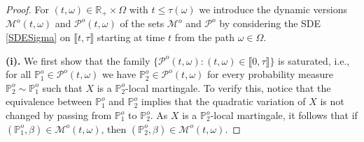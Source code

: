 \documentclass[11pt,a4paper]{article}
\numberwithin{equation}{section}
\def\dbP{\mathbb{P}}
\def\dbR{\mathbb{R}}
\newcommand{\cM}{\mathcal{M}}
\newcommand{\cP}{\mathcal{P}}
\theoremstyle{definition}
\begin{document}
\begin{proof}
  For $(t,\omega)\in\dbR_+\times\Omega$ with $t\leq\tau(\omega)$ we introduce the dynamic versions $\cM^o(t,\omega)$ and $\cP^o(t,\omega)$ of the sets $\cM^o$ and $\cP^o$ by considering the SDE \eqref{SDESigma} on $\llbracket t,\tau\rrbracket$ starting at time $t$ from the path $\omega\in\Omega$. 
  
  \vspace{2mm}
  
  \noindent \textbf{(i).} We first show that the family $\big\{\cP^o(t,\omega):(t,\omega)\in\llbracket 0,\tau\rrbracket\big\}$ is saturated, i.e., for all $\dbP_1^o\in\cP^o(t,\omega)$ we have $\dbP_2^o\in\cP^o(t,\omega)$ for every probability measure $\dbP_2^o\sim\dbP_1^o$ 
    such that $X$ is a $\dbP_2^o$-local martingale. 
  To verify this, notice that the equivalence between $\dbP_1^o$ and $\dbP_2^o$ implies that the quadratic variation of $X$ is not changed by passing from $\dbP_1^o$ to $\dbP_2^o$. 
  As $X$ is a $\dbP_2^o$-local martingale, it follows that if $(\dbP_1^o,\beta)\in\cM^o(t,\omega)$, then $(\dbP_2^o,\beta)\in\cM^o(t,\omega)$.
  
  \vspace{2mm}
  

\end{proof}
\end{document}
